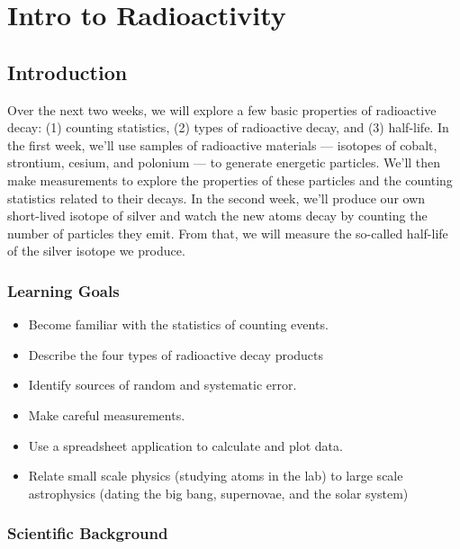 \chapter{Intro to Radioactivity}

\section{Introduction}

Over the next two weeks, we will explore a few basic properties of radioactive decay: (1) counting statistics, (2) types of radioactive decay, and (3) half-life. In the first week, we'll use samples of radioactive materials --- isotopes of cobalt, strontium, cesium, and polonium --- to generate energetic particles. We'll then make measurements to explore the properties of these particles and the counting statistics related to their decays. In the second week, we’ll produce our own short-lived isotope of silver and watch the new atoms decay by counting the number of particles they emit. From that, we will measure the so-called half-life of the silver isotope we produce.

\subsection{Learning Goals}

\begin{itemize}
	\item Become familiar with the statistics of counting events.
	
	\item Describe the four types of radioactive decay products
	
	\item Identify sources of random and systematic error.
	
	\item Make careful measurements.
	
	\item Use a spreadsheet application to calculate and plot data.
	
	\item Relate small scale physics (studying atoms in the lab) to large scale astrophysics (dating the big bang, supernovae, and the solar system)
\end{itemize}

\subsection{Scientific Background}

